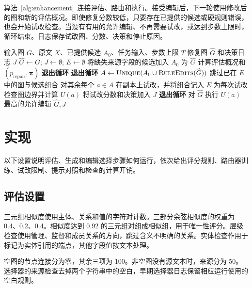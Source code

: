 算法~\ref{alg:enhancement}~连接评估、路由和执行。接受编辑后，下一轮使用修改后的图和新的评估概况。即使修复分数较低，只要存在已提供的候选或硬规则错误，也会开始试改检查。当没有有用的允许编辑、不再需要试改，或达到步数上限时，循环结束。日志保存试改图、分数、决策和停止原因。

\begin{algorithm}[t]
\caption{带试改检查的尺度感知编辑选择}
\label{alg:enhancement}
\begin{algorithmic}[1]
\Require 输入图 $G$、原文 $X$、已提供候选 $A_0$、任务输入、步数上限 $T$
\Ensure 修复图 $\widehat G$ 和决策日志 $J$
\State $\widehat G\gets G$; $J\gets\emptyset$; $E\gets\emptyset$
\State 将缺失来源字段的候选加入 $A_0$
    \State 为 $\widehat G$ 计算评估概况和 $(p_{\mathrm{repair}},\boldsymbol\pi)$
        \State \textbf{退出循环}
    \EndIf
        \State \textbf{退出循环}
    \EndIf
    \State $A\gets\textsc{Unique}(A_0\cup\textsc{RuleEdits}(\widehat G))$
    \State 跳过已在 $E$ 中的图与候选组合
    \State 对其余每个 $a\in A$ 在副本上试改，并将组合记入 $E$
    \State 为每次试改检查图边界并计算 $U(a)$
    \State 将试改分数和决策加入 $J$
        \State \textbf{退出循环}
    \EndIf
    \State 对 $\widehat G$ 执行 $U(a)$ 最高的允许编辑
\EndFor
\State \Return $\widehat G,J$
\end{algorithmic}
\end{algorithm}

\section{实现}
\label{sec:implementation}

以下设置说明评估、生成和编辑选择步骤如何运行，依次给出评分规则、路由器训练、试改限制、提示对照和检查的计算开销。

\subsection{评估设置}

三元组相似度使用主体、关系和值的字符对计数。三部分余弦相似度的权重为 0.4、0.2、0.4。相似度达到 0.92 的三元组对组成相似组，用于唯一性评分。层级检查使用管理、监督和成员关系的方向，跳过含义不明确的关系。实体检查作用于标记为实体引用的端点，其他字段值按文本处理。

空图的节点连接分为零，其余三项为 100。非空图没有源文本时，来源分为 50。选择器的来源检查去掉两个字符串中的空白，早期选择器日志保留相应运行使用的空白规则。

